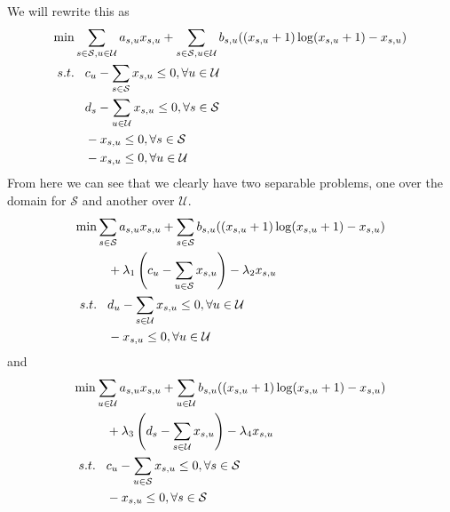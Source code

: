 \documentclass[12pt,letter]{article}
\begin{document}
We will rewrite this as
\begin{align*}
\min\hspace{3mm}&\hspace{-3mm}\sum\limits_{s\in\mathcal{S},u\in\mathcal{U}}a_{s,u}x_{s,u} + 
	\sum\limits_{s\in\mathcal{S},u\in\mathcal{U}}b_{s,u}((x_{s,u}+1)\log(x_{s,u}+1)-x_{s,u})\\
s.t.\hspace{3mm} &c_u - \sum\limits_{s\in\mathcal{S}}x_{s,u}\leq 0, \forall u\in\mathcal{U}\\ 
     &d_s - \sum\limits_{u\in\mathcal{U}}x_{s,u}\leq 0, \forall s\in\mathcal{S}\\
     &-x_{s,u}\leq 0, \forall s\in\mathcal{S}\\
     &-x_{s,u}\leq 0, \forall u\in\mathcal{U}
\end{align*}
From here we can see that we clearly have two separable problems, one over the
domain for $\mathcal{S}$ and another over $\mathcal{U}$.
\begin{align*}
\min\hspace{3mm}&\hspace{-3mm}\sum\limits_{s\in\mathcal{S}}a_{s,u}x_{s,u} + 
	\sum\limits_{s\in\mathcal{S}}b_{s,u}((x_{s,u}+1)\log(x_{s,u}+1)-x_{s,u}) \\
	&+ \lambda_1 \left(c_u - \sum\limits_{u\in\mathcal{S}}x_{s,u}\right) -\lambda_2x_{s,u}\\
 s.t.\hspace{3mm}    &d_u - \sum\limits_{s\in\mathcal{U}}x_{s,u}\leq 0, \forall u\in\mathcal{U}\\
     &-x_{s,u}\leq 0, \forall u\in\mathcal{U}\\
\end{align*}
and
\begin{align*}
\min\hspace{3mm}&\hspace{-3mm}\sum\limits_{u\in\mathcal{U}}a_{s,u}x_{s,u} + 
	\sum\limits_{u\in\mathcal{U}}b_{s,u}((x_{s,u}+1)\log(x_{s,u}+1)-x_{s,u}) \\
	&+ \lambda_3 \left(d_s - \sum\limits_{s\in\mathcal{U}}x_{s,u}\right) -\lambda_4 x_{s,u}\\
 s.t.\hspace{3mm}    &c_u - \sum\limits_{u\in\mathcal{S}}x_{s,u}\leq 0, \forall s\in\mathcal{S}\\
     &-x_{s,u}\leq 0, \forall s\in\mathcal{S}\\
\end{align*}
\end{document}
